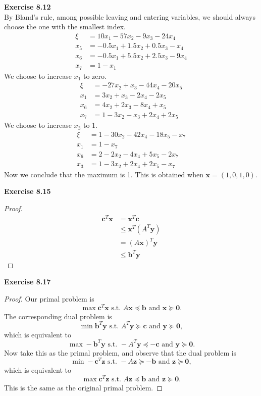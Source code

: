 \documentclass[letterpaper,12pt]{article}
\theoremstyle{definition}
\renewcommand{\vec}[1]{\mathbf{#1}}
\begin{document}
\noindent\textbf{Exercise 8.12} \\
By Bland's rule, among possible leaving and entering variables, we should always choose the one with the smallest index.
\begin{align*}
  \xi &= 10x_1 - 57x_2 -9x_3 -24x_4 \\
  x_5 &= -0.5x_1 + 1.5x_2 + 0.5x_3 - x_4\\
  x_6 &= -0.5x_1 + 5.5x_2 + 2.5x_3 - 9x_4 \\
  x_7 &= 1 - x_1
\end{align*}
We choose to increase $x_1$ to zero.
\begin{align*}
  \xi &= -27x_2 + x_3 - 44x_4 - 20x_5 \\
  x_1 &= 3x_2 + x_3 - 2x_4 - 2x_5 \\
  x_6 &= 4x_2 + 2x_3 - 8x_4 + x_5 \\
  x_7 &= 1 - 3x_2 - x_3 + 2x_4 + 2x_5
\end{align*}
We choose to increase $x_3$ to 1.
\begin{align*}
  \xi &= 1 - 30x_2 - 42x_4 - 18x_5 - x_7 \\
  x_1 &= 1 - x_7\\
  x_6 &= 2 - 2x_2 - 4x_4 + 5x_5 - 2x_7 \\
  x_3 &= 1 - 3x_2 + 2x_4 + 2x_5 - x_7
\end{align*}
Now we conclude that the maximum is 1. This is obtained when $\vec{x} = (1,0,1,0).$

\noindent\textbf{Exercise 8.15}
\begin{proof}
  \begin{align*}
    \vec{c}^T \vec{x} &= \vec{x}^T \vec{c} \\
    &\leq \vec{x}^T (A^T \vec{y}) \\
    &= (A\vec{x})^T \vec{y} \\
    &\leq \vec{b}^T \vec{y}
  \end{align*}

\end{proof}

\noindent\textbf{Exercise 8.17}
\begin{proof}
  Our primal problem is $$ \max \vec{c}^T \vec{x} \text{ s.t. } A\vec{x}\preceq \vec{b} \text{ and } \vec{x} \succeq \vec{0}.$$
  The corresponding dual problem is $$\min \vec{b}^T \vec{y} \text{ s.t. } A^T \vec{y} \succeq \vec{c} \text{ and } \vec{y} \succeq \vec{0},$$
  which is equivalent to $$\max -\vec{b}^T \vec{y} \text{ s.t. } -A^T \vec{y} \preceq -\vec{c} \text{ and } \vec{y} \succeq \vec{0}.$$
  Now take this as the primal problem, and observe that the dual problem is
  $$\min -\vec{c}^T \vec{z} \text{ s.t. } -A \vec{z} \succeq -\vec{b} \text{ and } \vec{z} \succeq \vec{0},$$
  which is equivalent to
  $$\max \vec{c}^T \vec{z} \text{ s.t. } A \vec{z} \preceq \vec{b} \text{ and } \vec{z} \succeq \vec{0}.$$
  This is the same as the original primal problem.
\end{proof}
\end{document}
